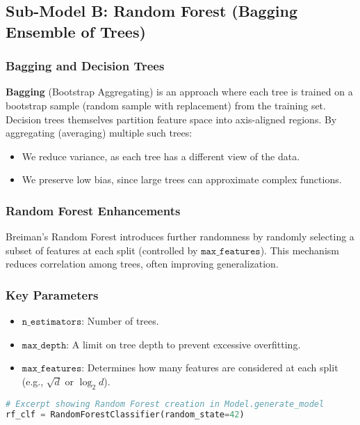 \documentclass[12pt]{article}
\begin{document}
\subsection{Sub-Model B: Random Forest (Bagging Ensemble of Trees)}

\subsubsection{Bagging and Decision Trees}
\textbf{Bagging} (Bootstrap Aggregating) is an approach where each tree is trained on a bootstrap sample (random sample with replacement) from the training set. Decision trees themselves partition feature space into axis-aligned regions. By aggregating (averaging) multiple such trees:
\begin{itemize}[noitemsep]
    \item We reduce variance, as each tree has a different view of the data.
    \item We preserve low bias, since large trees can approximate complex functions.
\end{itemize}

\subsubsection{Random Forest Enhancements}
Breiman’s Random Forest \cite{breiman2001random} introduces further randomness by randomly selecting a subset of features at each split (controlled by \(\texttt{max\_features}\)). This mechanism reduces correlation among trees, often improving generalization.

\subsubsection{Key Parameters}
\begin{itemize}[noitemsep]
    \item \(\texttt{n\_estimators}\): Number of trees.
    \item \(\texttt{max\_depth}\): A limit on tree depth to prevent excessive overfitting.
    \item \(\texttt{max\_features}\): Determines how many features are considered at each split (e.g., \(\sqrt{d}\) or \(\log_2 d\)).
\end{itemize}

\begin{lstlisting}[language=Python]
# Excerpt showing Random Forest creation in Model.generate_model
rf_clf = RandomForestClassifier(random_state=42)
\end{lstlisting}
\end{document}
